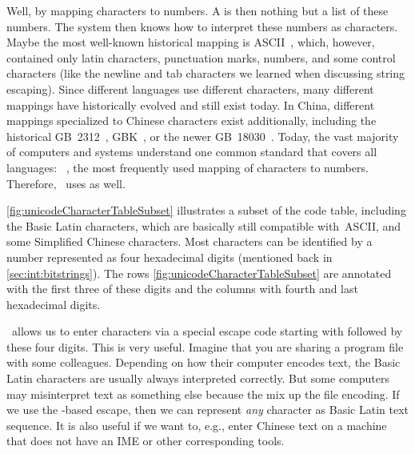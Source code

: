 Well, by mapping characters to numbers.
A  is then nothing but a list of these numbers.
The system then knows how to interpret these numbers as characters.
Maybe the most well-known historical mapping is ASCII~\cite{ASA1963ASCII,USAS1967USCFII}, which, however, contained only latin characters, punctuation marks, numbers, and some control characters (like the newline and tab characters we learned when discussing string escaping).
Since different languages use different characters, many different mappings have historically evolved and still exist today.
In China, different mappings specialized to Chinese characters exist additionally, including the historical GB~2312~\cite{GBT23121980PROCNSG21CCECSFIE}, GBK~\cite{TSSL1995CICSNSE}, or the newer GB~18030~\cite{GB180302022ITCCCS}.
Today, the vast majority of computers and systems understand one common standard that covers all languages:
~\cite{TUC2023U1510,TUC2023U151ACS,ISOIEC106462020ITUCCSU}, the most frequently used mapping of characters to numbers.
Therefore, \python\ uses  as well.

\cref{fig:unicodeCharacterTableSubset} illustrates a subset of the  code table, including the Basic Latin characters, which are basically still compatible with~ASCII, and some Simplified Chinese characters.
Most  characters can be identified by a number represented as four hexadecimal digits (mentioned back in \cref{sec:int:bitstrings}).
The rows \cref{fig:unicodeCharacterTableSubset} are annotated with the first three of these digits and the columns with fourth and last hexadecimal digits.

\python\ allows us to enter  characters via a special escape code starting with \pythonil{\\u} followed by these four digits.
This is very useful.
Imagine that you are sharing a program file with some colleagues.
Depending on how their computer encodes text, the Basic Latin characters are usually always interpreted correctly.
But some computers may misinterpret  text as something else because the mix up the file encoding.
If we use the \pythonil{\\u}-based escape, then we can represent \emph{any} character as Basic Latin text sequence.
It is also useful if we want to, e.g., enter Chinese text on a machine that does not have an IME or other corresponding tools.


